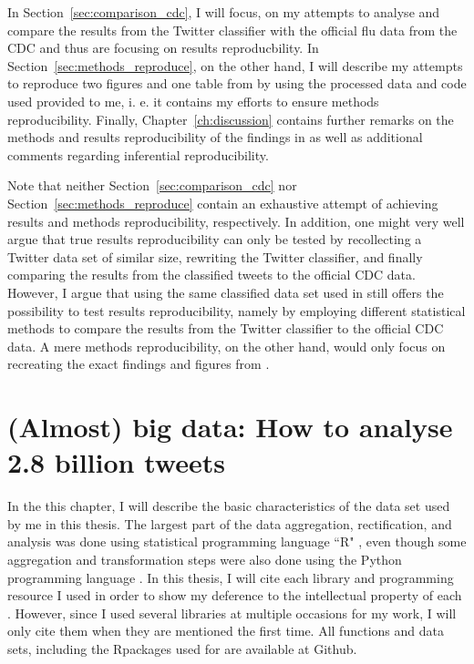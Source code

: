 \documentclass[11pt, a4paper,twoside]{report}\usepackage[]{graphicx}\usepackage[]{color}
\begin{document}
In Section~\ref{sec:comparison_cdc}, I will focus, on my attempts to analyse and compare the results from the Twitter classifier with the official flu data from the CDC and thus are focusing on results reproducbility. In Section~\ref{sec:methods_reproduce}, on the other hand, I will describe my attempts to reproduce two figures and one table from \cite{bodnar_data_2015} by using the processed data and code used provided to me, i. e. it contains my efforts to ensure methods reproducibility. Finally, Chapter~\ref{ch:discussion} contains further remarks on the methods and results reproducibility of the findings in \cite{bodnar_data_2015} as well as additional comments regarding inferential reproducibility.

Note that neither Section~\ref{sec:comparison_cdc} nor Section~\ref{sec:methods_reproduce} contain an exhaustive attempt of achieving results and methods reproducibility, respectively. In addition, one might very well argue that true results reproducibility can only be tested by recollecting a Twitter data set of similar size, rewriting the Twitter classifier, and finally comparing the results from the classified tweets to the official CDC data. However, I argue that using the same classified data set used in \cite{bodnar_data_2015} still offers the possibility to test results reproducibility, namely by employing different statistical methods to compare the results from the Twitter classifier to the official CDC data. A mere methods reproducibility, on the other hand, would only focus on recreating the exact findings and figures from \cite{bodnar_data_2015}.

\thispagestyle{empty}
\cleardoublepage

\chapter{(Almost) big data: How to analyse 2.8 billion tweets}
\label{ch:data_set_description}
In the this chapter, I will describe the basic characteristics of the data set used by me in this thesis. The largest part of the data aggregation, rectification, and analysis was done using statistical programming language ``R" \citep{Rbase}, even though some aggregation and transformation steps were also done using the Python programming language \citep{rossum_1995_python}. In this thesis, I will cite each library and programming resource I used in order to show my deference to the intellectual property of each . However, since I used several libraries at multiple occasions for my work,  I will only cite them when they are mentioned the first time. All functions and data sets, including the Rpackages used for  are available at Github.
\end{document}
